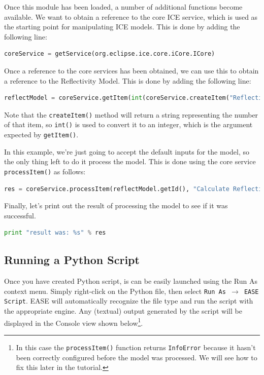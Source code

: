 \documentclass{article}
\begin{document}
Once this module has been loaded, a number of additional functions become
available. We want to obtain a reference to the core ICE service, which is used
as the starting point for manipulating ICE models. This is done by adding the
following line:

\begin{lstlisting}[frame=single,language=Python]
coreService = getService(org.eclipse.ice.core.iCore.ICore)
\end{lstlisting}

Once a reference to the core services has been obtained, we can use this to
obtain a reference to the Reflectivity Model. This is done by adding the
following line:

\begin{lstlisting}[frame=single,language=Python]
reflectModel = coreService.getItem(int(coreService.createItem("Reflectivity Model")))
\end{lstlisting}

Note that the \texttt{createItem()} method will return a string representing the
number of that item, so \texttt{int()} is used to convert it to an integer, which is the
argument expected by \texttt{getItem()}.

In this example, we're just going to accept the default inputs for the model, so
the only thing left to do it process the model. This is done using the core
service \texttt{processItem()} as follows:

\begin{lstlisting}[frame=single,language=Python]
res = coreService.processItem(reflectModel.getId(), "Calculate Reflectivity", 1)
\end{lstlisting}

Finally, let's print out the result of processing the model to see if it was
successful.

\begin{lstlisting}[frame=single,language=Python]
print "result was: %s" % res
\end{lstlisting}

\subsection{Running a Python Script}

Once you have created Python script, is can be easily launched using the Run As
context menu. Simply right-click on the Python file, then select \texttt{Run As
$\rightarrow$ EASE Script}. EASE will automatically recognize the file type and
run the script with the appropriate engine. Any (textual) output generated by
the script will be displayed in the Console view shown below\footnote{
In this case the \texttt{processItem()} function returns \texttt{InfoError}
because it hasn't been correctly configured before the model was processed. We
will see how to fix this later in the tutorial.}.
\end{document}
